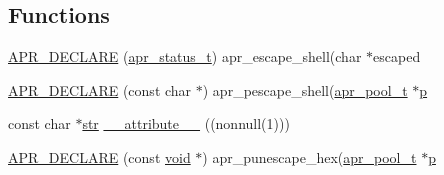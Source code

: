 \subsection*{Functions}
\begin{DoxyCompactItemize}
\item 
\hyperlink{group__APR__Util__Escaping_ga4570b4b5085d335569a79bbf15de5e6c}{A\+P\+R\+\_\+\+D\+E\+C\+L\+A\+RE} (\hyperlink{group__apr__errno_gaa5105fa83cc322f09382292db8b47593}{apr\+\_\+status\+\_\+t}) apr\+\_\+escape\+\_\+shell(char $\ast$escaped
\item 
\hyperlink{group__APR__Util__Escaping_gad430516478eb028242ee07e038fa23d2}{A\+P\+R\+\_\+\+D\+E\+C\+L\+A\+RE} (const char $\ast$) apr\+\_\+pescape\+\_\+shell(\hyperlink{structapr__pool__t}{apr\+\_\+pool\+\_\+t} $\ast$\hyperlink{group__APACHE__CORE__MPM_ga5cd91701e5c167f2b1a38e70ab57817e}{p}
\item 
const char $\ast$\hyperlink{group__APR__Util__Bucket__Brigades_ga6a62b60443be1d042194af15ce934193}{str} \hyperlink{group__APR__Util__Escaping_gadf78ae743e941e2953850378b0a10952}{\+\_\+\+\_\+attribute\+\_\+\+\_\+} ((nonnull(1)))
\item 
\hyperlink{group__APR__Util__Escaping_ga719679c3fadfc18bc004e2c855fe0cec}{A\+P\+R\+\_\+\+D\+E\+C\+L\+A\+RE} (const \hyperlink{group__MOD__ISAPI_gacd6cdbf73df3d9eed42fa493d9b621a6}{void} $\ast$) apr\+\_\+punescape\+\_\+hex(\hyperlink{structapr__pool__t}{apr\+\_\+pool\+\_\+t} $\ast$\hyperlink{group__APACHE__CORE__MPM_ga5cd91701e5c167f2b1a38e70ab57817e}{p}
\end{DoxyCompactItemize}
